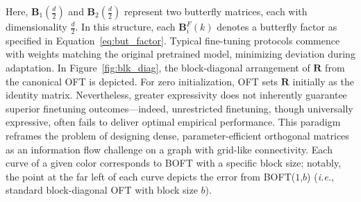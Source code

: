 Here, $\bm{B}_1(\frac{d}{2})$ and $\bm{B}_2(\frac{d}{2})$ represent two butterfly matrices, each with dimensionality $\frac{d}{2}$. In this structure, each $\bm{B}^F_i(k)$ denotes a butterfly factor as specified in Equation~\ref{eq:but_factor}. Typical fine-tuning protocols commence with weights matching the original pretrained model, minimizing deviation during adaptation. In Figure~\ref{fig:blk_diag}, the block-diagonal arrangement of $\bm{R}$ from the canonical OFT is depicted. For zero initialization, OFT sets $\bm{R}$ initially as the identity matrix. Nevertheless, greater expressivity does not inherently guarantee superior finetuning outcomes—indeed, unrestricted finetuning, though universally expressive, often fails to deliver optimal empirical performance. This paradigm reframes the problem of designing dense, parameter-efficient orthogonal matrices as an information flow challenge on a graph with grid-like connectivity. Each curve of a given color corresponds to BOFT with a specific block size; notably, the point at the far left of each curve depicts the error from BOFT($1$,$b$) (\emph{i.e.}, standard block-diagonal OFT with block size $b$). 
